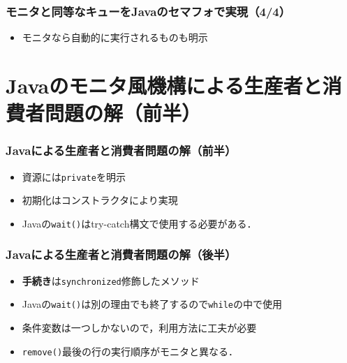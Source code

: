 \documentclass{beamer}                   %
\begin{document}
\begin{frame}
  \frametitle{モニタと同等なキューをJavaのセマフォで実現（4/4）}

  \begin{itemize}
  \item モニタなら自動的に実行されるものも明示
  \end{itemize}
\end{frame}

\section{Javaのモニタ風機構による生産者と消費者問題の解（前半）}
\begin{frame}
  \frametitle{Javaによる生産者と消費者問題の解（前半）}

  \begin{itemize}
  \item 資源には{\tt private}を明示
  \item 初期化はコンストラクタにより実現
  \item Javaの{\tt wait()}はtry-catch構文で使用する必要がある．
  \end{itemize}
\end{frame}

\begin{frame}
  \frametitle{Javaによる生産者と消費者問題の解（後半）}

  \begin{itemize}
  \item {\bf 手続き}は{\tt synchronized}修飾したメソッド
  \item Javaの{\tt wait()}は別の理由でも終了するので{\tt while}の中で使用
  \item 条件変数は一つしかないので，利用方法に工夫が必要
  \item {\tt remove()}最後の行の実行順序がモニタと異なる．
  \end{itemize}
\end{frame}
\end{document}
